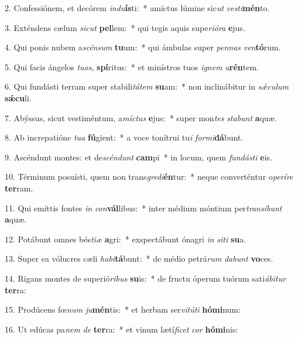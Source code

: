 2. Confessiónem, et decórem \textit{ind}\textit{u}\textbf{ís}ti:~*  amíctus lúmine sic\textit{ut} \textit{ves}\textit{ti}\textbf{mén}to.\

3. Exténdens cælum \textit{sic}\textit{ut} \textbf{pel}lem:~*  qui tegis aquis supe\textit{ri}\textit{ó}\textit{ra} \textbf{e}jus.\

4. Qui ponis nubem a\textit{scén}\textit{sum} \textbf{tu}um:~*  qui ámbulas super \textit{pen}\textit{nas} \textit{ven}\textbf{tó}rum.\

5. Qui facis ángelos \textit{tu}\textit{os}, \textbf{spí}ritus:~*  et minístros tuos \textit{i}\textit{gnem} \textit{u}\textbf{rén}tem.\

6. Qui fundásti terram super stabili\textit{tá}\textit{tem} \textbf{su}am:~*  non inclinábitur in \textit{sǽ}\textit{cu}\textit{lum} \textbf{sǽ}\textbf{cu}li.\

7. Abýssus, sicut vestiméntum, a\textit{míc}\textit{tus} \textbf{e}jus:~*  super mon\textit{tes} \textit{sta}\textit{bunt} \textbf{a}quæ.\

8. Ab increpatióne \textit{tu}\textit{a} \textbf{fú}gient:~*  a voce tonítrui tu\textit{i} \textit{for}\textit{mi}\textbf{dá}bunt.\

9. Ascéndunt montes: et de\textit{scén}\textit{dunt} \textbf{cam}pi~*  in locum, quem \textit{fun}\textit{dás}\textit{ti} \textbf{e}is.\

10. Términum posuísti, quem non trans\textit{gre}\textit{di}\textbf{én}tur:~*  neque converténtur o\textit{pe}\textit{rí}\textit{re} \textbf{ter}ram.\

11. Qui emíttis fontes \textit{in} \textit{con}\textbf{vál}libus:~*  inter médium móntium per\textit{trans}\textit{í}\textit{bunt} \textbf{a}quæ.\

12. Potábunt omnes bés\textit{ti}\textit{æ} \textbf{a}gri:~*  exspectábunt ónagri \textit{in} \textit{si}\textit{ti} \textbf{su}a.\

13. Super ea vólucres cæli \textit{ha}\textit{bi}\textbf{tá}bunt:~*  de médio petrá\textit{rum} \textit{da}\textit{bunt} \textbf{vo}ces.\

14. Rigans montes de superió\textit{ri}\textit{bus} \textbf{su}is:~*  de fructu óperum tuórum sati\textit{á}\textit{bi}\textit{tur} \textbf{ter}ra:\

15. Prodúcens fœ\textit{num} \textit{ju}\textbf{mén}tis:~*  et herbam ser\textit{vi}\textit{tú}\textit{ti} \textbf{hó}\textbf{mi}num:\

16. Ut edúcas pa\textit{nem} \textit{de} \textbf{ter}ra:~*  et vinum lætí\textit{fi}\textit{cet} \textit{cor} \textbf{hó}\textbf{mi}nis:\

